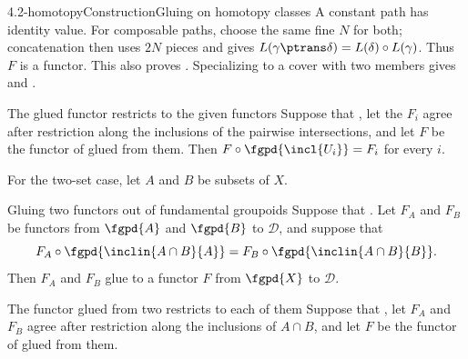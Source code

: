 \begin{proofpassage}{4.2-homotopy}{Construction}{Gluing on homotopy classes}
A constant path has identity value.  For composable paths, choose the
same fine $N$ for both; concatenation then uses $2N$ pieces and gives
$L(\gamma\ptrans\delta)=L(\delta)\circ L(\gamma)$.
Thus $F$ is a functor.
This also proves .  Specializing to a cover with two members
gives  and .
\end{proofpassage}

\begin{proposition}[id=4.3]{The glued functor restricts to the given functors}
Suppose that \hypCoverFamily, let the $F_{i}$ agree after restriction along the
inclusions of the pairwise intersections, and let $F$ be the functor of
 glued from them.  Then $F \circ \fgpd{\incl{U_{i}}} = F_{i}$ for
every $i$.
\end{proposition}

For the two-set case, let $A$ and $B$ be subsets of $X$.

\begin{definition}[id=4.4]{Gluing two functors out of fundamental groupoids}
Suppose that \hypCoverTwo.  Let $F_{A}$ and $F_{B}$ be functors from
$\fgpd{A}$ and $\fgpd{B}$ to $\mathcal{D}$, and suppose that
\[
  F_{A} \circ \fgpd{\inclin{A \cap B}{A}}
    = F_{B} \circ \fgpd{\inclin{A \cap B}{B}}.
\]
Then $F_{A}$ and $F_{B}$ glue to a functor $F$ from $\fgpd{X}$ to
$\mathcal{D}$.
\end{definition}

\begin{proposition}[id=4.5]{The functor glued from two restricts to each of them}
Suppose that \hypCoverTwo, let $F_{A}$ and $F_{B}$ agree after restriction along
the inclusions of $A \cap B$, and let $F$ be the functor of  glued
from them.
\end{proposition}
